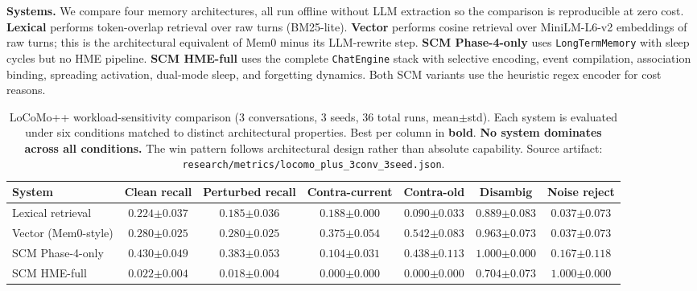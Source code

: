 \documentclass[11pt,twocolumn]{article}
\begin{document}
\textbf{Systems.} We compare four memory architectures, all run offline without LLM extraction so the comparison is reproducible at zero cost. \textbf{Lexical} performs token-overlap retrieval over raw turns (BM25-lite). \textbf{Vector} performs cosine retrieval over MiniLM-L6-v2 embeddings of raw turns; this is the architectural equivalent of Mem0 minus its LLM-rewrite step. \textbf{SCM Phase-4-only} uses \texttt{LongTermMemory} with sleep cycles but no HME pipeline. \textbf{SCM HME-full} uses the complete \texttt{ChatEngine} stack with selective encoding, event compilation, association binding, spreading activation, dual-mode sleep, and forgetting dynamics. Both SCM variants use the heuristic regex encoder for cost reasons.

\begin{table}[t]
\centering
\caption{LoCoMo++ workload-sensitivity comparison (3 conversations, 3 seeds, 36 total runs, mean$\pm$std). Each system is evaluated under six conditions matched to distinct architectural properties. Best per column in \textbf{bold}. \textbf{No system dominates across all conditions.} The win pattern follows architectural design rather than absolute capability. Source artifact: \texttt{research/metrics/locomo\_plus\_3conv\_3seed.json}.}
\label{tab:workload}
{\footnotesize
\begin{tabular}{@{}lcccccc@{}}
\toprule
\textbf{System} & \textbf{Clean recall} & \textbf{Perturbed recall} & \textbf{Contra-current} & \textbf{Contra-old} & \textbf{Disambig} & \textbf{Noise reject} \\
\midrule
Lexical retrieval         & $0.224{\scriptstyle\pm0.037}$ & $0.185{\scriptstyle\pm0.036}$ & $0.188{\scriptstyle\pm0.000}$ & $0.090{\scriptstyle\pm0.033}$ & $0.889{\scriptstyle\pm0.083}$ & $0.037{\scriptstyle\pm0.073}$ \\
Vector (Mem0-style)       & $0.280{\scriptstyle\pm0.025}$ & $0.280{\scriptstyle\pm0.025}$ & $\mathbf{0.375{\scriptstyle\pm0.054}}$ & $\mathbf{0.542{\scriptstyle\pm0.083}}$ & $0.963{\scriptstyle\pm0.073}$ & $0.037{\scriptstyle\pm0.073}$ \\
SCM Phase-4-only          & $\mathbf{0.430{\scriptstyle\pm0.049}}$ & $\mathbf{0.383{\scriptstyle\pm0.053}}$ & $0.104{\scriptstyle\pm0.031}$ & $0.438{\scriptstyle\pm0.113}$ & $\mathbf{1.000{\scriptstyle\pm0.000}}$ & $0.167{\scriptstyle\pm0.118}$ \\
SCM HME-full              & $0.022{\scriptstyle\pm0.004}$ & $0.018{\scriptstyle\pm0.004}$ & $0.000{\scriptstyle\pm0.000}$ & $0.000{\scriptstyle\pm0.000}$ & $0.704{\scriptstyle\pm0.073}$ & $\mathbf{1.000{\scriptstyle\pm0.000}}$ \\
\bottomrule
\end{tabular}}
\end{table}
\end{document}
